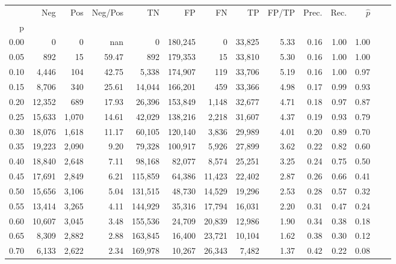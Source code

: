 \begin{tabular}{rrrrrrrrrrrrrr}
\toprule
{} &     Neg &    Pos & Neg/Pos &       TN &       FP &      FN &      TP & FP/TP & Prec. &  Rec. & $\hat{p}$ \\
p    &         &        &         &          &          &         &         &       &       &       &           \\
\midrule
0.00 &       0 &      0 &     nan &        0 &  180,245 &       0 &  33,825 &  5.33 &  0.16 &  1.00 &      1.00 \\
0.05 &     892 &     15 &   59.47 &      892 &  179,353 &      15 &  33,810 &  5.30 &  0.16 &  1.00 &      1.00 \\
0.10 &   4,446 &    104 &   42.75 &    5,338 &  174,907 &     119 &  33,706 &  5.19 &  0.16 &  1.00 &      0.97 \\
0.15 &   8,706 &    340 &   25.61 &   14,044 &  166,201 &     459 &  33,366 &  4.98 &  0.17 &  0.99 &      0.93 \\
0.20 &  12,352 &    689 &   17.93 &   26,396 &  153,849 &   1,148 &  32,677 &  4.71 &  0.18 &  0.97 &      0.87 \\
0.25 &  15,633 &  1,070 &   14.61 &   42,029 &  138,216 &   2,218 &  31,607 &  4.37 &  0.19 &  0.93 &      0.79 \\
0.30 &  18,076 &  1,618 &   11.17 &   60,105 &  120,140 &   3,836 &  29,989 &  4.01 &  0.20 &  0.89 &      0.70 \\
0.35 &  19,223 &  2,090 &    9.20 &   79,328 &  100,917 &   5,926 &  27,899 &  3.62 &  0.22 &  0.82 &      0.60 \\
0.40 &  18,840 &  2,648 &    7.11 &   98,168 &   82,077 &   8,574 &  25,251 &  3.25 &  0.24 &  0.75 &      0.50 \\
0.45 &  17,691 &  2,849 &    6.21 &  115,859 &   64,386 &  11,423 &  22,402 &  2.87 &  0.26 &  0.66 &      0.41 \\
0.50 &  15,656 &  3,106 &    5.04 &  131,515 &   48,730 &  14,529 &  19,296 &  2.53 &  0.28 &  0.57 &      0.32 \\
0.55 &  13,414 &  3,265 &    4.11 &  144,929 &   35,316 &  17,794 &  16,031 &  2.20 &  0.31 &  0.47 &      0.24 \\
0.60 &  10,607 &  3,045 &    3.48 &  155,536 &   24,709 &  20,839 &  12,986 &  1.90 &  0.34 &  0.38 &      0.18 \\
0.65 &   8,309 &  2,882 &    2.88 &  163,845 &   16,400 &  23,721 &  10,104 &  1.62 &  0.38 &  0.30 &      0.12 \\
0.70 &   6,133 &  2,622 &    2.34 &  169,978 &   10,267 &  26,343 &   7,482 &  1.37 &  0.42 &  0.22 &      0.08 \\

\end{tabular}
